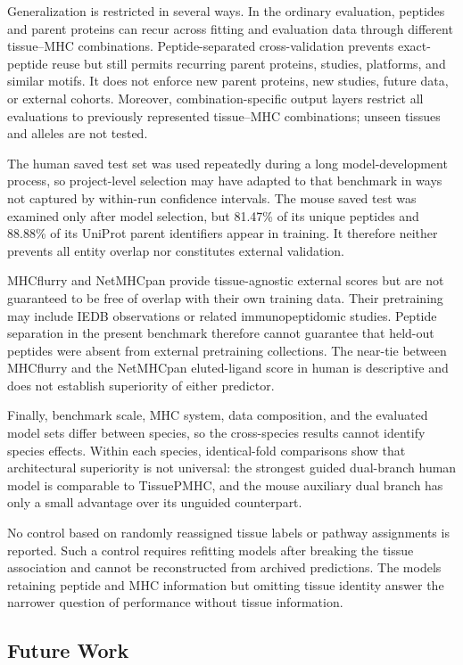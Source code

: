 Generalization is restricted in several ways. In the ordinary evaluation, peptides and parent proteins can recur across fitting and evaluation data through different tissue--MHC combinations. Peptide-separated cross-validation prevents exact-peptide reuse but still permits recurring parent proteins, studies, platforms, and similar motifs. It does not enforce new parent proteins, new studies, future data, or external cohorts. Moreover, combination-specific output layers restrict all evaluations to previously represented tissue--MHC combinations; unseen tissues and alleles are not tested.

The human saved test set was used repeatedly during a long model-development process, so project-level selection may have adapted to that benchmark in ways not captured by within-run confidence intervals. The mouse saved test was examined only after model selection, but 81.47\% of its unique peptides and 88.88\% of its UniProt parent identifiers appear in training. It therefore neither prevents all entity overlap nor constitutes external validation.

MHCflurry and NetMHCpan provide tissue-agnostic external scores but are not guaranteed to be free of overlap with their own training data. Their pretraining may include IEDB observations or related immunopeptidomic studies. Peptide separation in the present benchmark therefore cannot guarantee that held-out peptides were absent from external pretraining collections. The near-tie between MHCflurry and the NetMHCpan eluted-ligand score in human is descriptive and does not establish superiority of either predictor.

Finally, benchmark scale, MHC system, data composition, and the evaluated model sets differ between species, so the cross-species results cannot identify species effects. Within each species, identical-fold comparisons show that architectural superiority is not universal: the strongest guided dual-branch human model is comparable to TissuePMHC, and the mouse auxiliary dual branch has only a small advantage over its unguided counterpart.

No control based on randomly reassigned tissue labels or pathway assignments is reported. Such a control requires refitting models after breaking the tissue association and cannot be reconstructed from archived predictions. The models retaining peptide and MHC information but omitting tissue identity answer the narrower question of performance without tissue information.

\subsection{Future Work}

